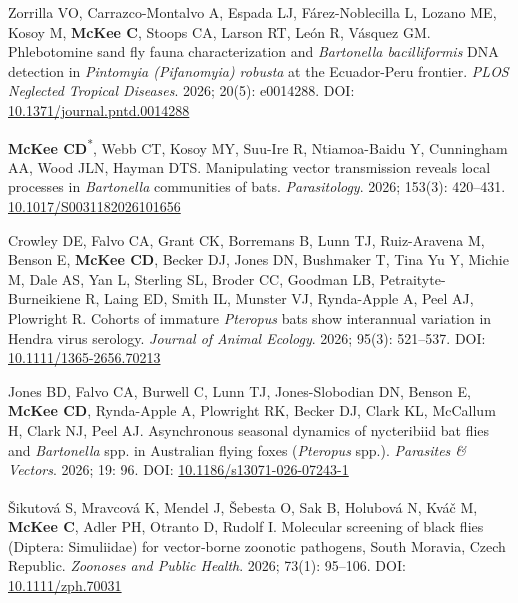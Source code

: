 \documentclass{cv}
\begin{document}
\begin{pubenum}

\item Zorrilla VO, Carrazco-Montalvo A, Espada LJ, Fárez-Noblecilla L, Lozano ME, Kosoy M, \textbf{McKee C}, Stoops CA, Larson RT, León R, Vásquez GM. Phlebotomine sand fly fauna characterization and \textit{Bartonella bacilliformis} DNA detection in \textit{Pintomyia (Pifanomyia) robusta} at the Ecuador-Peru frontier. \textit{PLOS Neglected Tropical Diseases}. 2026; 20(5): e0014288. DOI: \href{https://doi.org/10.1371/journal.pntd.0014288}{10.1371/journal.pntd.0014288}

\item \textbf{McKee CD}\textsuperscript{*}, Webb CT, Kosoy MY, Suu-Ire R, Ntiamoa-Baidu Y, Cunningham AA, Wood JLN, Hayman DTS. Manipulating vector transmission reveals local processes in \textit{Bartonella} communities of bats. \textit{Parasitology}. 2026; 153(3): 420--431. \href{https://doi.org/10.1017/S0031182026101656}{10.1017/S0031182026101656}

\item Crowley DE, Falvo CA, Grant CK, Borremans B, Lunn TJ, Ruiz-Aravena M, Benson E, \textbf{McKee CD}, Becker DJ, Jones DN, Bushmaker T, Tina Yu Y, Michie M, Dale AS, Yan L, Sterling SL, Broder CC, Goodman LB, Petraityte-Burneikiene R, Laing ED, Smith IL, Munster VJ, Rynda-Apple A, Peel AJ, Plowright R. Cohorts of immature \textit{Pteropus} bats show interannual variation in Hendra virus serology. \textit{Journal of Animal Ecology}. 2026; 95(3): 521--537. DOI: \href{http://doi.org/10.1111/1365-2656.70213}{10.1111/1365-2656.70213}

\item Jones BD, Falvo CA, Burwell C, Lunn TJ, Jones-Slobodian DN, Benson E, \textbf{McKee CD}, Rynda-Apple A, Plowright RK, Becker DJ, Clark KL, McCallum H, Clark NJ, Peel AJ. Asynchronous seasonal dynamics of nycteribiid bat flies and \textit{Bartonella} spp. in Australian flying foxes (\textit{Pteropus} spp.). \textit{Parasites \& Vectors}. 2026; 19: 96. DOI: \href{https://doi.org/10.1186/s13071-026-07243-1}{10.1186/s13071-026-07243-1}

\item Šikutová S\textsuperscript{\dag}, Mravcová K\textsuperscript{\dag}, Mendel J, Šebesta O, Sak B, Holubová N, Kváč M, \textbf{McKee C}, Adler PH, Otranto D, Rudolf I. Molecular screening of black flies (Diptera: Simuliidae) for vector‐borne zoonotic pathogens, South Moravia, Czech Republic. \textit{Zoonoses and Public Health}. 2026; 73(1): 95--106. DOI: \href{https://doi.org/10.1111/zph.70031}{10.1111/zph.70031}


\end{pubenum}
\end{document}
